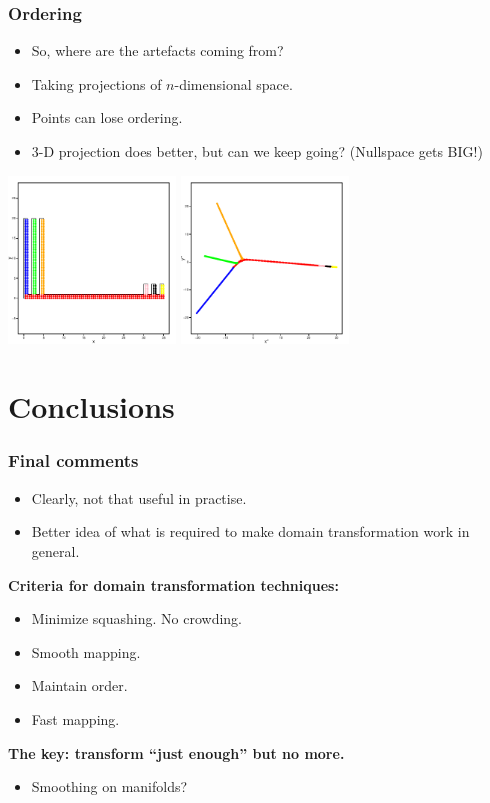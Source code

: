 \documentclass[ignorenonframetext]{beamer} %
\newcommand{\bc}{\begin{center}}
\newcommand{\ec}{\end{center}}
\newcommand{\bi}{\begin{itemize}}
\newcommand{\ei}{\end{itemize}}
\begin{document}
\begin{frame}
	\frametitle{Ordering}
	\bi
		\item So, where are the artefacts coming from?
		\item Taking projections of $n$-dimensional space.
		\item Points can lose ordering.
		\item 3-D projection does better, but can we keep going? (Nullspace gets BIG!)
	\ei
	\centering
              \includegraphics[height=1.75in]{figs/comb.pdf} \includegraphics[height=1.75in]{figs/comb-2d.pdf}
\end{frame}

\section{Conclusions}

\begin{frame}
	\frametitle{Final comments}
		\bi
			\item Clearly, not that useful in practise.
			\item Better idea of what is required to make domain transformation work in general.
		\ei
		\textbf{Criteria for domain transformation techniques:}
          \bi
            \item Minimize squashing. No crowding.
            \item Smooth mapping.
            \item Maintain order.
            \item Fast mapping.
           \ei
         \bc \textbf{The key: transform ``just enough'' but no more.} \ec
         \bi
         		\item Smoothing on manifolds?
        \ei
\end{frame}
\end{document}
